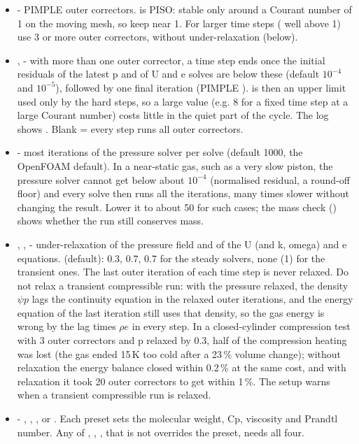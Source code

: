 \begin{itemize}
    \item {} - PIMPLE outer correctors.  is PISO: stable only around a Courant number of 1 on the moving mesh, so keep  near 1. For larger time steps ( well above 1) use 3 or more outer correctors, without under-relaxation (below).
    \item {},  - with more than one outer corrector, a time step ends once the initial residuals of the latest p and of U and e solves are below these (default $10^{-4}$ and $10^{-5}$), followed by one final iteration (PIMPLE ).  is then an upper limit used only by the hard steps, so a large value (e.g. 8 for a fixed time step at a large Courant number) costs little in the quiet part of the cycle. The log shows . Blank = every step runs all outer correctors.
    \item {} - most iterations of the pressure solver per solve (default 1000, the OpenFOAM default). In a near-static gas, such as a very slow piston, the pressure solver cannot get below about $10^{-4}$ (normalised residual, a round-off floor) and every solve then runs all the iterations, many times slower without changing the result. Lower it to about 50 for such cases; the mass check () shows whether the run still conserves mass.
    \item {}, ,  - under-relaxation of the pressure field and of the U (and k, omega) and e equations.  (default): 0.3, 0.7, 0.7 for the steady solvers, none (1) for the transient ones. The last outer iteration of each time step is never relaxed. Do not relax a transient compressible run: with the pressure relaxed, the density $\psi p$ lags the continuity equation in the relaxed outer iterations, and the energy equation of the last iteration still uses that density, so the gas energy is wrong by the lag times $\rho e$ in every step. In a closed-cylinder compression test with 3 outer correctors and p relaxed by 0.3, half of the compression heating was lost (the gas ended 15\,K too cold after a 23\,\% volume change); without relaxation the energy balance closed within 0.2\,\% at the same cost, and with relaxation it took 20 outer correctors to get within 1\,\%. The setup warns when a transient compressible run is relaxed.
    \item {} - , , ,  or . Each preset sets the molecular weight, Cp, viscosity and Prandtl number. Any of , , ,  that is not  overrides the preset,  needs all four.

\end{itemize}
